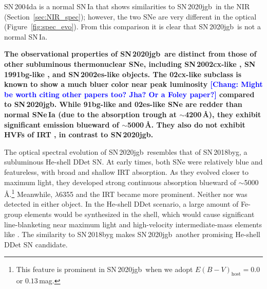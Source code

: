 \documentclass[twocolumn]{aastex631}
\newcommand{\sn}{SN\,2020jgb}
\newcommand{\chang}[1]{\textcolor{blue}{[Chang: #1]}}
\newcommand{\revise}[1]{\textbf{#1}}
\begin{document}
SN\,2004da is a normal SN\,Ia that shows similarities to \sn\ in the NIR (Section~\ref{sec:NIR_spec}); however, the two SNe are very different in the optical (Figure~\ref{fig:spec_evo}). From this comparison it is clear that \sn\ is not a normal SN\,Ia. 

\revise{The observational properties of \sn\ are distinct from those of other subluminous thermonuclear SNe, including SN\,2002cx-like \citep[02cx-like\footnote{This subclass is also referred to as Type Iax SNe \citep{Foley_Iax_2013}};][]{Li_02cx_2003}, SN\,1991bg-like \citep[91bg-like;][]{Filippenko_91bg_1992}, and SN\,2002es-like \citep[02es-like;][]{Ganeshalingam_02es_2012} objects. The 02cx-like subclass is known to show a much bluer color near peak luminosity \citep[$g-r\approx0$\,mag;][]{Miller_2017} \chang{Might be worth citing other papers too? Jha? Or a Foley paper?} compared to \sn. While 91bg-like and 02es-like SNe are redder than normal SNe\,Ia (due to the \ion{Ti}{2} absorption trough at $\sim$4200\,\AA), they exhibit significant emission blueward of $\sim$5000\,\AA. They also do not exhibit HVFs of \ion{Ca}{2} IRT \citep[e.g.,][]{Silverman_HVF_2015}, in contrast to \sn.}

The optical spectral evolution of \sn\ resembles that of SN\,2018byg, a subluminous He-shell DDet SN. At early times, both SNe were relatively blue and featureless, with broad and shallow  IRT absorption. As they evolved closer to maximum light, they developed strong continuous absorption blueward of $\sim$5000\,\AA.\footnote{This feature is prominent in \sn\ when we adopt $E(B-V)_\mathrm{host} = 0.0$ or $0.13$\,mag.} Meanwhile,  $\lambda$6355 and the  IRT became more prominent. Neither  nor  was detected in either object. In the He-shell DDet scenario, a large amount of Fe-group elements would be synthesized in the shell, which would cause significant line-blanketing near maximum light \citep{Kromer_DD_2010, polin_observational_2019} and high-velocity intermediate-mass elements like  \citep{Fink_DD_2010, Kromer_DD_2010,Shen_DD_2014}. The similarity to SN\,2018byg makes \sn\ another promising He-shell DDet SN candidate.
\end{document}

